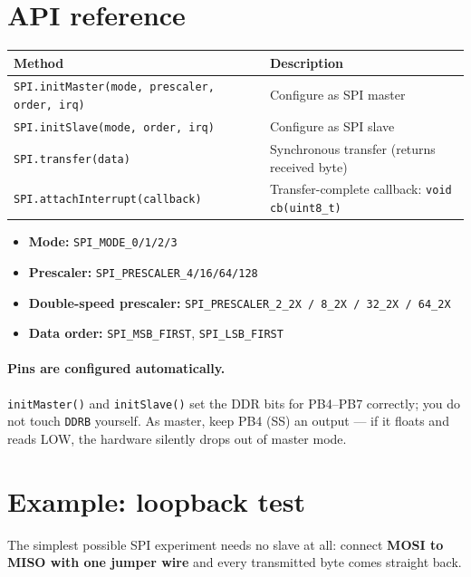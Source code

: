 \documentclass[11pt,a4paper]{article}
\begin{document}
\section{API reference}

\begin{center}
\footnotesize
\begin{tabular}{ll}
\toprule
\textbf{Method} & \textbf{Description} \\
\midrule
\texttt{SPI.initMaster(mode, prescaler, order, irq)} & Configure as SPI master \\
\texttt{SPI.initSlave(mode, order, irq)} & Configure as SPI slave \\
\texttt{SPI.transfer(data)} & Synchronous transfer (returns received byte) \\
\texttt{SPI.attachInterrupt(callback)} & Transfer-complete callback: \texttt{void cb(uint8\_t)} \\
\bottomrule
\end{tabular}
\end{center}

\begin{itemize}
  \item \textbf{Mode:} \texttt{SPI\_MODE\_0/1/2/3}
  \item \textbf{Prescaler:} \texttt{SPI\_PRESCALER\_4/16/64/128}
  \item \textbf{Double-speed prescaler:}
        \texttt{SPI\_PRESCALER\_2\_2X / 8\_2X / 32\_2X / 64\_2X}
  \item \textbf{Data order:} \texttt{SPI\_MSB\_FIRST}, \texttt{SPI\_LSB\_FIRST}
\end{itemize}

\paragraph{Pins are configured automatically.} \texttt{initMaster()} and
\texttt{initSlave()} set the DDR bits for PB4--PB7 correctly; you do not
touch \texttt{DDRB} yourself. As master, keep PB4 (SS) an output --- if it
floats and reads LOW, the hardware silently drops out of master mode.

\section{Example: loopback test}

The simplest possible SPI experiment needs no slave at all: connect
\textbf{MOSI to MISO with one jumper wire} and every transmitted byte comes
straight back.
\end{document}
